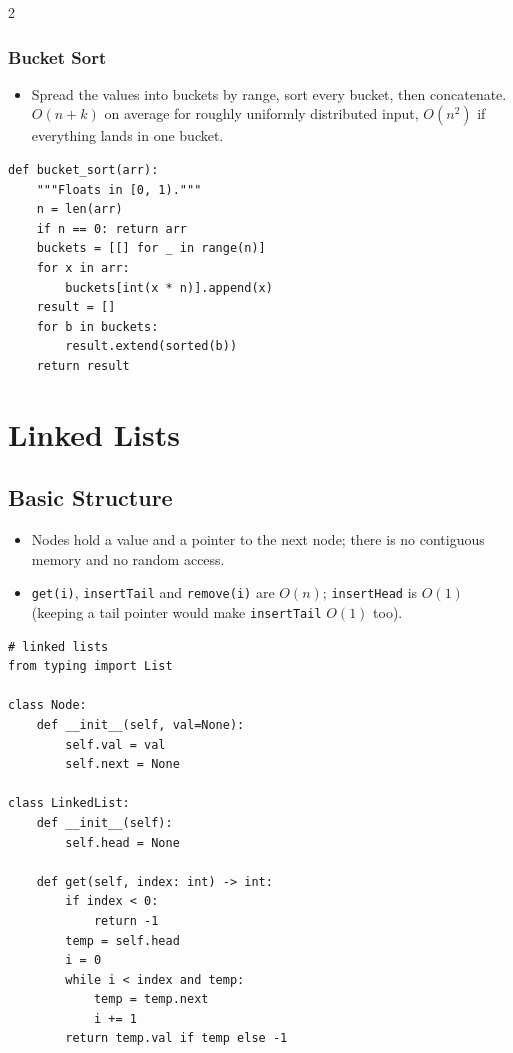 \documentclass[9pt,a4paper]{extarticle}
\begin{document}
\begin{multicols}{2}
\subsubsection{Bucket Sort}

\begin{itemize}
\item Spread the values into buckets by range, sort every bucket, then concatenate. $O(n+k)$ on average for roughly uniformly distributed input, $O(n^2)$ if everything lands in one bucket.
\end{itemize}

\begin{lstlisting}
def bucket_sort(arr):
    """Floats in [0, 1)."""
    n = len(arr)
    if n == 0: return arr
    buckets = [[] for _ in range(n)]
    for x in arr:
        buckets[int(x * n)].append(x)
    result = []
    for b in buckets:
        result.extend(sorted(b))
    return result
\end{lstlisting}

\section{Linked Lists}

\subsection{Basic Structure}

\begin{itemize}
\item Nodes hold a value and a pointer to the next node; there is no contiguous memory and no random access.
\item \texttt{get(\allowbreak{}i)}, \texttt{insertTail} and \texttt{remove(\allowbreak{}i)} are $O(n)$; \texttt{insertHead} is $O(1)$ (keeping a tail pointer would make \texttt{insertTail} $O(1)$ too).
\end{itemize}

\begin{lstlisting}
# linked lists
from typing import List

class Node:
    def __init__(self, val=None):
        self.val = val
        self.next = None

class LinkedList:
    def __init__(self):
        self.head = None

    def get(self, index: int) -> int:
        if index < 0:
            return -1
        temp = self.head
        i = 0
        while i < index and temp:
            temp = temp.next
            i += 1
        return temp.val if temp else -1


\end{lstlisting}
\end{multicols}
\end{document}
